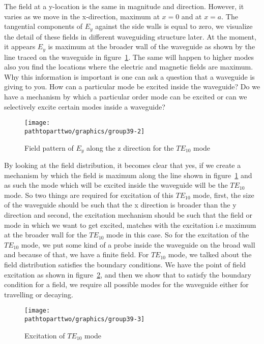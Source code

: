 The field at a y-location is the same in magnitude and direction. However, it varies as we move in the x-direction, maximum at $x = 0$ and at $x = a$. The tangential components of $E_y$ against the side walls is equal to zero, we visualize the detail of these fields in different waveguiding structure later. At the moment, it appears $E_y$ is maximum at the broader wall of the waveguide as shown by the line traced on the waveguide in figure~\ref{fig:lec39-2}. The same will happen to higher modes also you find the locations where the electric and magnetic fields are maximum. Why this information is important is one can ask a question that a waveguide is giving to you. How can a particular mode be excited inside the waveguide? Do we have a mechanism by which a particular order mode can be excited or can we selectively excite certain modes inside a waveguide?
\begin{figure}[h]
\centering
\texttt{[image: \\pathtoparttwo/graphics/group39-2]}
\caption{Field pattern of $E_y$ along the z direction for the $TE_{10}$ mode}
\label{fig:lec39-2}
\end{figure}

By looking at the field distribution, it becomes clear that yes, if we create a mechanism by which the field is maximum along the line shown in figure~\ref{fig:lec39-2} and as such the mode which will be excited inside the waveguide will be the $TE_{10}$ mode. So two things are required for excitation of this $TE_{10}$ mode, first, the size of the waveguide should be such that the x direction is broader than the y direction and second, the excitation mechanism should be such that the field or mode in which we want to get excited, matches with the excitation i.e maximum at the broader wall for the $TE_{10}$ mode in this case. So for the excitation of the $TE_{10}$ mode, we put some kind of a probe inside the waveguide on the broad wall and because of that, we have a finite field. For $TE_{10}$ mode, we talked about the field distribution satisfies the boundary conditions. We have the point of field excitation as shown in figure~\ref{fig:lec39-3}, and then we show that to satisfy the boundary condition for a field, we require all possible modes for the waveguide either for travelling or decaying.
\begin{figure}[h]
\centering
\texttt{[image: \\pathtoparttwo/graphics/group39-3]}
\caption{Excitation of $TE_{10}$ mode}
\label{fig:lec39-3}
\end{figure}

